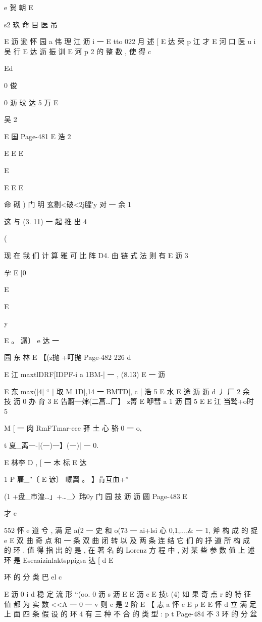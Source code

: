 {{{{e 贺 朝
E

s2 玖 命 目 医 吊

E 沥 逊 怀
园 a 伟 理 江
沥 i 一
E
tto 022
月 述
[
E 达 荣 p 江 才
E 河 口
医 u i 吴 行
E 达 沥 振 训
E 河 p 2
的 整 数 , 使 得
c

Ed

0 俊

0 沥 玟 达 5 万
E

吴
2

E 国
Page-481
E 浩 2

E E
E

E

E
E E

命 砌 ) 门
明
玄剔<破<2j腥′y 对 一 余 1

这 与 (3. 11) 一 起 推 出
4

(

现 在 我 们 计 算 雅 可 比 阵 D4. 由 链 式 法 则 有
E 沥 3

孕
E [0

E

E

y

E
。 潺〕 e 达 一

园 东 林
E 【(z抛 +叮抛%
Page-482
226 d

E 江
maxtlDRF[IDPF-i a 1BM-| 一 , (8.13)
E 一 沥

E 东
max(|4| “ | 取 M 1D|,14 一 BMTD|,
c [ 浩 5
E 水
E 途 沥 沥 d 丿 厂 2 余 技 沥 0 办 育 3
E 告蔚一婶(二菖…厂】 z箐 E 咿彗 a
1 沥
国 5
E
E 江 当鹫+o时 5

M [ 一 肉 RmFTmar-ece 驿 土 心 骆 0 一 o,

t 夏_离一-|(一)一】(一)| 一 0.

E
林李
D ,
[ 一 木 标
E 达

1
P 雇_″〔 E 谚〕 崛翼 。 】肯互血+”

(1 +盘_市湟…」+…_〉玮0y 门
园 技 沥 沥 圆
Page-483
E

才 c

552 怀 e
道 兮 , 满 足 a(2 一 史 和 o(73 一 ai+lsi 心 0,1,...,& 一 1, 斧 构 成 的 捉
e
E
双 曲 奇 点 和 一 条 双 曲 闭 转 以 及 两 条 连 结 它 们 的 抒 道 所 构 成 的 环 .
值 得 指 出 的 是 , 在 著 名 的 Lorenz 方 程 中 , 对 某 些 参 数 值 上 述 环 是
Eseaaizinlaktsppigsa 达 [ d
E

环 的 分 类
巴 el c

E 沥
0 i d
稳 定 流 形 “(oo.
0 沥 s 沥
E
E 沥 c
E 技t
(4) 如 果 奇 点 r 的 特 征 值 都 为 实 数 <<A 一 0 一 v 则 c 是 2 阶
E
【 志 a 怀 c
E p
E
E 怀 d 立
满 足 上 面 四 条 假 设 的 环 4 有 三 种 不 合 的 类 型 :
p t
Page-484
不 3 环 的 分 盆

}}}}
